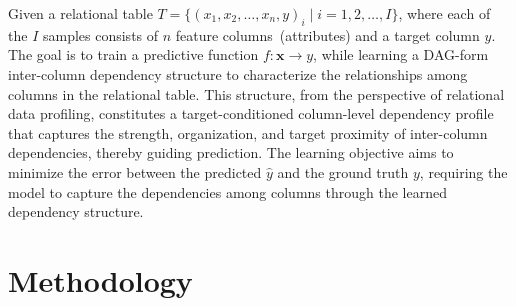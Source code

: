 \documentclass[conference]{IEEEtran}
\newcommand{\sy}[1]{{\color{black}#1}}
\newcommand{\syfix}[1]{{\color{black}#1}}
\newcommand{\vldb}[1]{{\color{black}#1}}
\newcommand{\zjic}[1]{{\color{black}#1}}
\newcommand{\syic}[1]{{\color{black}#1}}
\begin{document}
\sy{
Given a \syic{relational} table $T = \{(x_1, x_2, \dots, x_n, y)_i \mid i = 1, 2, \dots, I\}$, where \syic{each of the} $I$ samples consists of $n$ feature columns~\syic{(attributes)} and a \syic{target column} $y$. 
\syfix{The} goal is to train a predictive function $f: \mathbf{x} \to y$\syic{, while learning a DAG-form inter-column dependency structure to characterize the relationships among columns in the relational table.}
\syic{This structure, from the perspective of relational data profiling, constitutes a target-conditioned column-level dependency profile that captures the strength, organization, and target proximity of inter-column dependencies, thereby guiding prediction.}
\syic{The learning} objective aims to minimize the error between the predicted $\hat{y}$ and the ground truth $y$, 
\zjic{requiring the model to capture the dependencies among columns through the learned dependency structure.
}
}


\section{Methodology}

\end{document}
